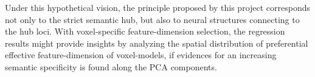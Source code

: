 Under this hypothetical vision, the \similarity principle proposed by this project corresponds not only to the strict semantic hub, but also to neural structures connecting to the hub loci. With voxel-specific feature-dimension selection, the regression results might provide insights by analyzing the spatial distribution of preferential effective feature-dimension of voxel-models, if evidences for an increasing semantic specificity is found along the PCA components.


